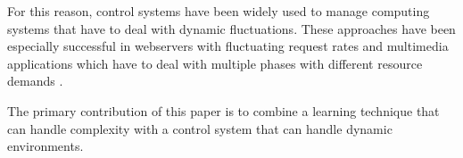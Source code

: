 For this reason, control systems
have been widely used to manage computing systems that have to deal
with dynamic fluctuations.  These approaches have been especially
successful in webservers with fluctuating request rates
\cite{Horvarth,LuEtAl-2006a,SunDaiPan-2008a} and multimedia
applications which have to deal with multiple phases with different
resource demands \cite{TCST,Agilos,grace2}.


The primary contribution of this paper is to combine a learning
technique that can handle complexity with a control system that can
handle dynamic environments.






